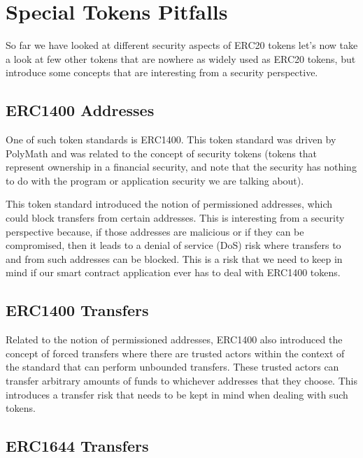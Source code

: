 \section{Special Tokens Pitfalls}\label{special-tokens-pitfalls}

So far we have looked at different security aspects of ERC20 tokens
let's now take a look at few other tokens that are nowhere as widely
used as ERC20 tokens, but introduce some concepts that are interesting
from a security perspective.

\subsection{ERC1400 Addresses}\label{erc1400-addresses}

One of such token standards is ERC1400. This token standard was driven
by PolyMath and was related to the concept of security tokens (tokens
that represent ownership in a financial security, and note that the
security has nothing to do with the program or application security we
are talking about).

This token standard introduced the notion of permissioned addresses,
which could block transfers from certain addresses. This is interesting
from a security perspective because, if those addresses are malicious or
if they can be compromised, then it leads to a denial of service (DoS)
risk where transfers to and from such addresses can be blocked. This is
a risk that we need to keep in mind if our smart contract application
ever has to deal with ERC1400 tokens.

\subsection{ERC1400 Transfers}\label{erc1400-transfers}

Related to the notion of permissioned addresses, ERC1400 also introduced
the concept of forced transfers where there are trusted actors within
the context of the standard that can perform unbounded transfers. These
trusted actors can transfer arbitrary amounts of funds to whichever
addresses that they choose. This introduces a transfer risk that needs
to be kept in mind when dealing with such tokens.

\subsection{ERC1644 Transfers}\label{erc1644-transfers}

